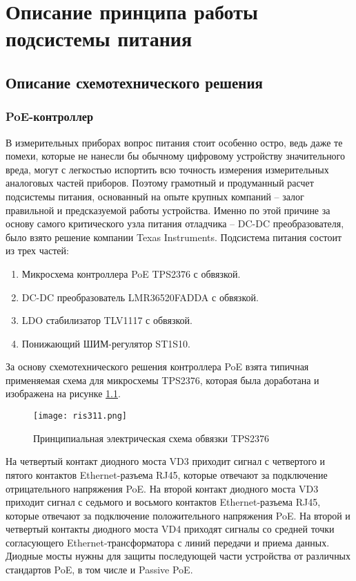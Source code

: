 \chapter{Описание принципа работы подсистемы питания}
\section{Описание схемотехнического решения}
\subsection{PoE-контроллер}
\hspace{1cm} 

В измерительных приборах вопрос питания стоит особенно остро, ведь даже те помехи, которые 
не нанесли бы обычному цифровому устройству значительного вреда, могут с легкостью испортить
всю точность измерения измерительных аналоговых частей приборов. Поэтому грамотный и продуманный расчет 
подсистемы питания, основанный на опыте крупных компаний -- залог правильной и предсказуемой работы устройства.
Именно по этой причине за основу самого критического узла питания отладчика -- DC-DC преобразователя,
было взято решение компании Texas Instruments.
Подсистема питания состоит из трех частей:

\begin{enumerate}
    \item Микросхема контроллера PoE TPS2376 с обвязкой.
    \item DC-DC преобразователь LMR36520FADDA с обвязкой.
    \item LDO стабилизатор TLV1117 с обвязкой.
    \item Понижающий ШИМ-регулятор  ST1S10.
\end{enumerate}

За основу схемотехнического решения контроллера PoE взята типичная применяемая схема для
микросхемы TPS2376, которая была доработана и изображена на рисунке \ref{ris:311}.

\begin{figure}[H]
    \centering
    \texttt{[image: ris311.png]}
    \caption{Принципиальная электрическая схема обвязки TPS2376 }
    \label{ris:311}
\end{figure}

На четвертый контакт диодного моста VD3 приходит сигнал с четвертого и пятого контактов 
Ethernet-разъема RJ45, которые отвечают за подключение отрицательного напряжения PoE.
На второй контакт диодного моста VD3 приходит сигнал с седьмого и восьмого контактов 
Ethernet-разъема RJ45, которые отвечают за подключение положительного напряжения PoE.  
На второй и четвертый контакты диодного моста VD4 приходят сигналы со средней точки согласующего
Ethernet-трансформатора с линий передачи и приема данных. Диодные мосты нужны для защиты последующей 
части устройства от различных стандартов PoE, в том числе и Passive PoE. 


